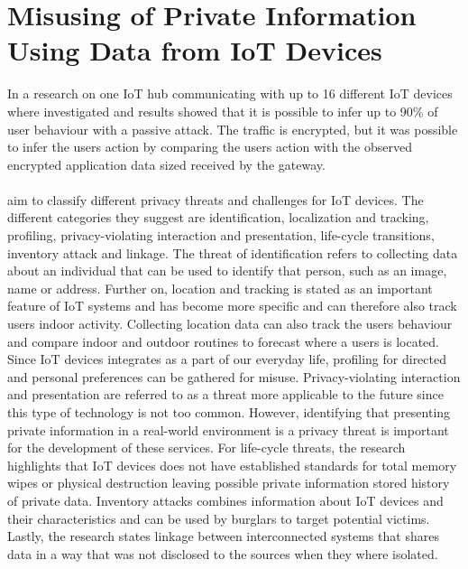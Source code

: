\section*{Misusing of Private Information Using Data from IoT Devices}
In \cite{PassiveInferenceIoT} a research on one IoT hub communicating with up to 16 different IoT devices where investigated and results showed that it is possible to infer up to 90\% of user behaviour with a passive attack. The traffic is encrypted, but it was possible to infer the users action by comparing the users action with the observed encrypted application data sized received by the gateway. 
\\\\
\cite{IoTPrivacyAndMisuse} aim to classify different privacy threats and challenges for IoT devices. The different categories they suggest are identification, localization and tracking, profiling, privacy-violating interaction and presentation, life-cycle transitions, inventory attack and linkage. The threat of identification refers to collecting data about an individual that can be used to identify that person, such as an image, name or address. Further on, location and tracking is stated as an important feature of IoT systems and has become more specific and can therefore also track users indoor activity. Collecting location data can also track the users behaviour and compare indoor and outdoor routines to forecast where a users is located. Since IoT devices integrates as a part of our everyday life, profiling for directed and personal preferences can be gathered for misuse. Privacy-violating interaction and presentation are referred to as a threat more applicable to the future since this type of technology is not too common. However, identifying that presenting private information in a real-world environment is a privacy threat is important for the development of these services. For life-cycle threats, the research \cite{IoTPrivacyAndMisuse} highlights that IoT devices does not have established standards for total memory wipes or physical destruction leaving possible private information stored history of private data. Inventory attacks combines information about IoT devices and their characteristics and can be used by burglars to target potential victims. Lastly, the research states linkage between interconnected systems that shares data in a way that was not disclosed to the sources when they where isolated. 
\\\\